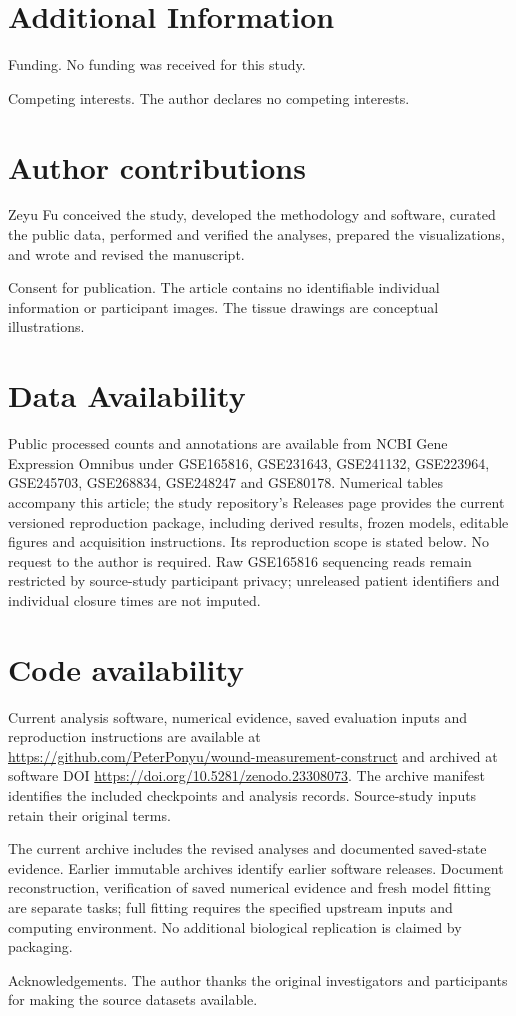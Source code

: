 \documentclass[10pt,a4paper]{article}
\begin{document}
\section*{Additional Information}
Funding. No funding was received for this study.

Competing interests. The author declares no competing interests.

\section*{Author contributions}
Zeyu Fu conceived the study, developed the methodology and software, curated the public data, performed and verified the analyses, prepared the visualizations, and wrote and revised the manuscript.



Consent for publication. The article contains no identifiable individual information or participant images. The tissue drawings are conceptual illustrations.

\section*{Data Availability}
Public processed counts and annotations are available from NCBI Gene Expression Omnibus under GSE165816, GSE231643, GSE241132, GSE223964, GSE245703, GSE268834, GSE248247 and GSE80178. Numerical tables accompany this article; the study repository's Releases page provides the current versioned reproduction package, including derived results, frozen models, editable figures and acquisition instructions. Its reproduction scope is stated below. No request to the author is required. Raw GSE165816 sequencing reads remain restricted by source-study participant privacy; unreleased patient identifiers and individual closure times are not imputed.

\section*{Code availability}
Current analysis software, numerical evidence, saved evaluation inputs and reproduction instructions are available at \url{https://github.com/PeterPonyu/wound-measurement-construct} and archived at software DOI \url{https://doi.org/10.5281/zenodo.23308073}. The archive manifest identifies the included checkpoints and analysis records. Source-study inputs retain their original terms.

The current archive includes the revised analyses and documented saved-state evidence. Earlier immutable archives identify earlier software releases. Document reconstruction, verification of saved numerical evidence and fresh model fitting are separate tasks; full fitting requires the specified upstream inputs and computing environment. No additional biological replication is claimed by packaging.

Acknowledgements. The author thanks the original investigators and participants for making the source datasets available.
\FloatBarrier


\end{document}

